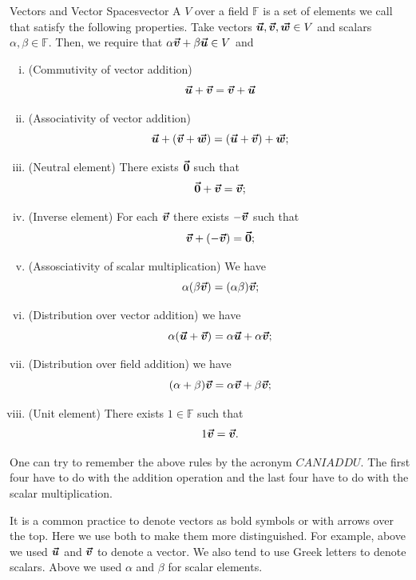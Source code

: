         \begin{df}{Vectors and Vector Spaces}{vector}
            A  $V$ over a field $\mathbb{F}$ is a set of elements we call  that satisfy the following properties. Take vectors $\boldsymbol{\boldsymbol{\vec{u}}},\boldsymbol{\boldsymbol{\vec{v}}},\boldsymbol{\boldsymbol{\vec{w}}} \in V$ and scalars $\alpha, \beta \in \mathbb{F}$. Then, we require that $\alpha\boldsymbol{\boldsymbol{\vec{v}}} + \beta\boldsymbol{\boldsymbol{\vec{u}}} \in V$ and 
            \begin{enumerate}[(i)]
                \item (Commutivity of vector addition)
                \[
                \boldsymbol{\boldsymbol{\vec{u}}}+\boldsymbol{\boldsymbol{\vec{v}}}=\boldsymbol{\boldsymbol{\vec{v}}}+\boldsymbol{\boldsymbol{\vec{u}}}
                \]
                \item (Associativity of vector addition)
                \[
                \boldsymbol{\boldsymbol{\vec{u}}}+(\boldsymbol{\boldsymbol{\vec{v}}}+\boldsymbol{\boldsymbol{\vec{w}}})=(\boldsymbol{\boldsymbol{\vec{u}}}+\boldsymbol{\boldsymbol{\vec{v}}})+\boldsymbol{\boldsymbol{\vec{w}}};
                \]
                \item (Neutral element) There exists $\boldsymbol{\vec{0}}$ such that
                \[
                \boldsymbol{\vec{0}}+\boldsymbol{\boldsymbol{\vec{v}}}=\boldsymbol{\boldsymbol{\vec{v}}};
                \]
                \item (Inverse element) For each $\boldsymbol{\boldsymbol{\vec{v}}}$ there exists $-\boldsymbol{\boldsymbol{\vec{v}}}$ such that
                \[
                \boldsymbol{\boldsymbol{\vec{v}}}+(-\boldsymbol{\boldsymbol{\vec{v}}})=\boldsymbol{\vec{0}};
                \]                
                \item (Assosciativity of scalar multiplication) We have
                \[
                \alpha(\beta \boldsymbol{\boldsymbol{\vec{v}}})=(\alpha \beta)\boldsymbol{\boldsymbol{\vec{v}}};
                \]
                \item (Distribution over vector addition) we have
                \[
                \alpha(\boldsymbol{\boldsymbol{\vec{u}}}+\boldsymbol{\boldsymbol{\vec{v}}})=\alpha \boldsymbol{\boldsymbol{\vec{u}}} + \alpha \boldsymbol{\boldsymbol{\vec{v}}};
                \]
                \item (Distribution over field addition) we have
                \[
                (\alpha+\beta)\boldsymbol{\boldsymbol{\vec{v}}} = \alpha \boldsymbol{\boldsymbol{\vec{v}}} + \beta \boldsymbol{\boldsymbol{\vec{v}}};
                \]
                \item (Unit element) There exists $1\in \mathbb{F}$ such that
                \[
                1\boldsymbol{\boldsymbol{\vec{v}}} = \boldsymbol{\boldsymbol{\vec{v}}}.
                \]
            \end{enumerate}
        \end{df}
        
        One can try to remember the above rules by the acronym $CANI ADDU$.  The first four have to do with the addition operation and the last four have to do with the scalar multiplication.
        
        \begin{remark}
            It is a common practice to denote vectors as bold symbols or with arrows over the top.  Here we use both to make them more distinguished.  For example, above we used $\boldsymbol{\boldsymbol{\vec{u}}}$ and $\boldsymbol{\boldsymbol{\vec{v}}}$ to denote a vector.  We also tend to use Greek letters to denote scalars.  Above we used $\alpha$ and $\beta$ for scalar elements.
        \end{remark}
        
